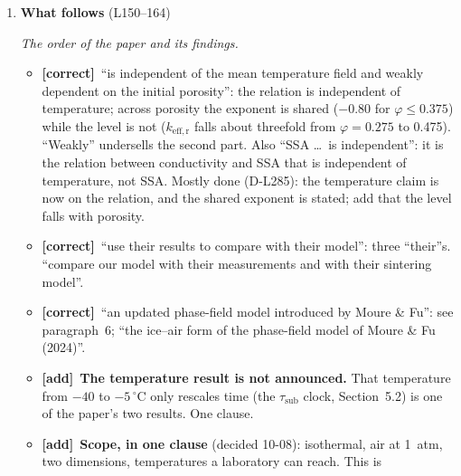 \documentclass[11pt]{article}
\newcommand{\Note}{\textcolor{open}{\textbf{[from the notes]}}\ }
\newcommand{\Pg}[3]{\item \textbf{#1} {\small(#2)}\par\textit{#3}}
\newcommand{\tC}{\textcolor{miss}{\textbf{[correct]}}\ }
\newcommand{\tG}{\textcolor{stale}{\textbf{[wording]}}\ }
\newcommand{\tA}{\textcolor{have}{\textbf{[add]}}\ }
\newcommand{\add}[1]{\textcolor{revA}{#1}}
\begin{document}
\begin{enumerate}
\begin{itemize}
    measured in the field and laboratory (Matzl \& Schneebeli, 2006; Gallet
    et al., 2009; Proksch et al., 2015; all in the \texttt{.bib}), so a law
    in SSA can be applied. One sentence.
  \item \tA \textbf{What the conductivity here includes.} \Note Fourteau et
    al.\ (2021) show that vapor transport under a gradient adds to the
    apparent conductivity; the conductivity here is conductive only, which
    is exact for isothermal sintering. One clause here or in Section~2.3.
  \item \tG ``effects'': ``affects''. ``macroscopic bodies of icy porous
    materials'': ``bulk properties of porous ice''. ``here on earth'': ``on
    Earth''. ``Significant work \ldots\ are needed'': ``is needed''.
  \end{itemize}
\Pg{What follows}{L150--164}{The order of the paper and its findings.}
  \begin{itemize}
  \item \tC ``is independent of the mean temperature field and weakly
    dependent on the initial porosity'': the relation is independent of
    temperature; across porosity the exponent is shared ($-0.80$ for
    $\varphi \le 0.375$) while the level is not ($k_{\mathrm{eff,r}}$ falls
    about threefold from $\varphi = 0.275$ to 0.475). ``Weakly'' undersells
    the second part. Also ``SSA \ldots\ is independent'': it is the relation
    between conductivity and SSA that is independent of temperature, not
    SSA.
    \add{Mostly done (D-L285): the temperature claim is now on the relation, and the shared exponent is stated; add that the level falls with porosity.}
  \item \tC ``use their results to compare with their model'': three
    ``their''s. ``compare our model with their measurements and with their
    sintering model''.
  \item \tC ``an updated phase-field model introduced by Moure \& Fu'':
    see paragraph~6; ``the ice--air form of the phase-field model of Moure
    \& Fu (2024)''.
  \item \tA \textbf{The temperature result is not announced.} That
    temperature from $-40$ to $-5\,^{\circ}$C only rescales time (the
    $\tau_{\mathrm{sub}}$ clock, Section~5.2) is one of the paper's two
    results. One clause.
  \item \tA \textbf{Scope, in one clause} (decided 10-08): isothermal, air
    at 1~atm, two dimensions, temperatures a laboratory can reach. This is

\end{itemize}
\end{enumerate}
\end{document}
